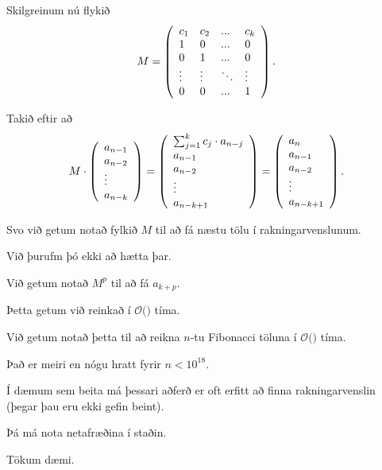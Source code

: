 {
	{
		\item<1-> Skilgreinum nú flykið
		\[
			M = \left (
			\env{array}
			{ {l l l l}
				c_1 & c_2 & ... & c_k\\
				1 & 0 & ... & 0\\
				0 & 1 & ... & 0\\
				\vdots & \vdots & \ddots & \vdots\\
				0 & 0 & ... & 1
			}
			\right ).
		\]
		\item<2-> Takið eftir að
		\[
			M
			\cdot
			\left (
			\env{array}
			{ {l}
				a_{n - 1}\\
				a_{n - 2}\\
				\vdots\\
				a_{n - k}
			}
			\right )
			=
			\left (
			\env{array}
			{ {l}
				\sum_{j = 1}^k c_j \cdot a_{n - j}\\
				a_{n - 1}\\
				a_{n - 2}\\
				\vdots\\
				a_{n - k + 1}
			}
			\right )
			=
			\left (
			\env{array}
			{ {l}
				a_n\\
				a_{n - 1}\\
				a_{n - 2}\\
				\vdots\\
				a_{n - k + 1}
			}
			\right ).
		\]
		\item<3-> Svo við getum notað fylkið $M$ til að fá næstu tölu í rakningarvenslunum.
	}
}

{
	{
		\item<1-> Við þurufm þó ekki að hætta þar.
		\item<2-> Við getum notað $M^p$ til að fá $a_{k + p}$.
		\item<3-> Þetta getum við reinkað í $\mathcal{O}($$)$ tíma.
		\item<5-> Við getum notað þetta til að reikna $n$-tu Fibonacci töluna í $\mathcal{O}($$)$ tíma.
		\item<7-> Það er meiri en nógu hratt fyrir $n < 10^{18}$.
	}
}

{
}

{
	{
		\item<1-> Í dæmum sem beita má þessari aðferð er oft erfitt að finna rakningarvenslin (þegar þau eru ekki gefin beint).
		\item<2-> Þá má nota netafræðina í staðin.
		\item<3-> Tökum dæmi.
	}
}

